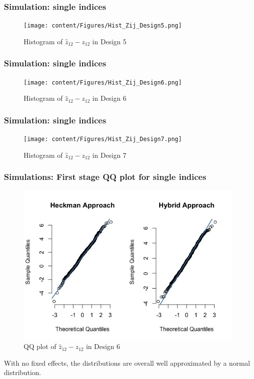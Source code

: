 \begin{frame}[label = single indices]
    \frametitle{Simulation: single indices}
    \begin{figure}[htbp]
        \centerline{\texttt{[image: content/Figures/Hist\_Zij\_Design5.png]}}
        \caption{\footnotesize{Histogram of $\hat{z}_{12} - z_{12}$ in Design 5}}
        \label{Hist_Zij_Design5}
      \end{figure}
\end{frame}

\begin{frame}
    \frametitle{Simulation: single indices}
    \begin{figure}[htbp]
        \centerline{\texttt{[image: content/Figures/Hist\_Zij\_Design6.png]}}
        \caption{\footnotesize{Histogram of $\hat{z}_{12} - z_{12}$ in Design 6}}
        \label{Hist_Zij_Design6}
      \end{figure}
\end{frame}

\begin{frame}
    \frametitle{Simulation: single indices}
    \begin{figure}[htbp]
        \centerline{\texttt{[image: content/Figures/Hist\_Zij\_Design7.png]}}
        \caption{\footnotesize{Histogram of $\hat{z}_{12} - z_{12}$ in Design 7}}
        \label{Hist_Zij_Design7}
      \end{figure}
\end{frame}

\begin{frame}
  \frametitle{Simulations: First stage QQ plot for single indices}
  \begin{figure}[htbp]
      \centerline{\includegraphics[scale=.35]{content/Figures/QQ_Zij_Design6.png}}
      \caption{\footnotesize{QQ plot of $\hat{z}_{12} - z_{12}$ in Design 6}}
      \label{QQ_Zij_Design6}
    \end{figure}
    With no fixed effects, the distributions are overall well approximated by a normal distribution.
\end{frame}

